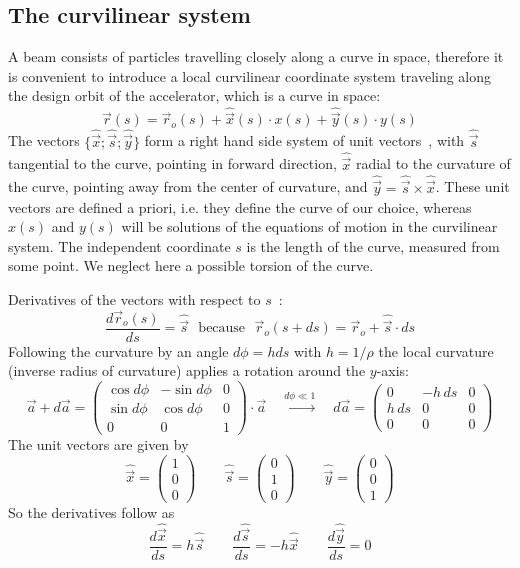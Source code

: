 \documentclass[12pt]{article}
\newcommand\beq{\begin{equation}}
\newcommand\eeq{\end{equation}}
\newcommand{\uvec}[1]{\mbox{$\hat{\vec{#1}}$}}
\begin{document}
\subsection{The curvilinear system}
A beam consists of particles travelling closely along a curve in space, therefore
it is convenient to introduce a local curvilinear coordinate system traveling along
the design orbit of the accelerator, which is a curve in space:
\beq\label{rvector}
\vec{r}(s)=\vec{r}_o(s)+\uvec{x}(s)\cdot x(s) + \uvec{y}(s)\cdot y(s)
\eeq
The vectors $\{ \uvec{x};\uvec{s};\uvec{y}\}$ form a right hand side system of unit vectors~\cite{ruth},
with \uvec{s} tangential to the curve, pointing in forward direction, \uvec{x} radial to the curvature of the curve, pointing away from the center of curvature, and $\uvec{y}=\uvec{s}\times\uvec{x}$.
These unit vectors are defined a priori, i.e. they define the curve of our choice, whereas
$x(s)$ and $y(s)$ will be solutions of the equations of motion in the curvilinear system. The independent coordinate $s$ is the length of the curve, measured from some point.
We neglect here a possible torsion of the curve.

Derivatives of the vectors with respect to $s$~\cite{rees,cs}:
\beq\label{dtvecr}
\frac{d\vec{r}_o(s)}{ds}=\uvec{s}\mbox{~~because~~}\vec{r}_o(s+ds)=\vec{r}_o+\uvec{s}\cdot ds
\eeq
Following the curvature by an angle $d\phi=h ds$ with $h=1/\rho$ the local curvature (inverse radius of curvature) applies a rotation around the $y$-axis:
\beq
\vec{a}+d\vec{a} =\left( \begin{array}{ccc}
\cos d\phi & -\sin d\phi & 0 \\ \sin d\phi & \cos d\phi & 0 \\ 0 & 0 & 1
\end{array}\right)\cdot \vec{a} \quad \stackrel{d\phi\ll 1}{\longrightarrow}\quad
d\vec{a} =\left( \begin{array}{ccc}
0 & -h\,ds & 0 \\ h\,ds & 0 & 0 \\ 0 & 0 & 0
\end{array}\right)
\eeq
The unit vectors are given by
\[
\uvec{x}=\left(\begin{array}{c}1 \\ 0 \\ 0 \end{array}\right) \qquad
\uvec{s}=\left(\begin{array}{c}0 \\ 1 \\ 0 \end{array}\right) \qquad
\uvec{y}=\left(\begin{array}{c}0 \\ 0 \\ 1 \end{array}\right)
\]
So the derivatives follow as
\beq\label{duvec}
\frac{d\uvec{x}}{ds}=h\uvec{s}\qquad
\frac{d\uvec{s}}{ds}=-h\uvec{x}\qquad
\frac{d\uvec{y}}{ds}=0
\eeq
\end{document}
